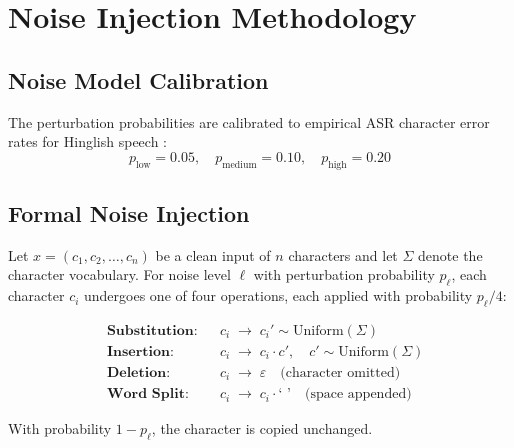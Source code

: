 \documentclass[12pt,a4paper]{report}
\begin{document}
\section{Noise Injection Methodology}

\subsection{Noise Model Calibration}
The perturbation probabilities are calibrated to empirical ASR character error rates for Hinglish speech \cite{shah2020learning}:
\[
  p_{\text{low}} = 0.05, \quad p_{\text{medium}} = 0.10, \quad p_{\text{high}} = 0.20
\]

\subsection{Formal Noise Injection}
Let $x = (c_1, c_2, \ldots, c_n)$ be a clean input of $n$ characters and let $\Sigma$ denote the character vocabulary. For noise level $\ell$ with perturbation probability $p_\ell$, each character $c_i$ undergoes one of four operations, each applied with probability $p_\ell / 4$:

\begin{align}
  &\textbf{Substitution:}  && c_i \;\longrightarrow\; c_i' \sim \mathrm{Uniform}(\Sigma) \label{eq:sub}\\
  &\textbf{Insertion:}     && c_i \;\longrightarrow\; c_i \cdot c', \quad c' \sim \mathrm{Uniform}(\Sigma) \label{eq:ins}\\
  &\textbf{Deletion:}      && c_i \;\longrightarrow\; \varepsilon \quad \text{(character omitted)} \label{eq:del}\\
  &\textbf{Word Split:}    && c_i \;\longrightarrow\; c_i \cdot \texttt{` '} \quad \text{(space appended)} \label{eq:spl}
\end{align}

With probability $1 - p_\ell$, the character is copied unchanged.
\end{document}
